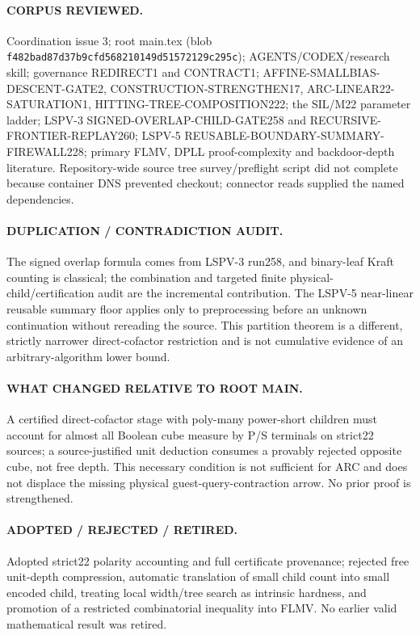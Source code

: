 \documentclass[10pt]{article}
\begin{document}
\paragraph{CORPUS REVIEWED.} Coordination issue 3; root main.tex (blob \texttt{f482bad87d37b9cfd568210149d51572129c295c}); AGENTS/CODEX/research skill; governance REDIRECT1 and CONTRACT1; AFFINE-SMALLBIAS-DESCENT-GATE2, CONSTRUCTION-STRENGTHEN17, ARC-LINEAR22-SATURATION1, HITTING-TREE-COMPOSITION222; the SIL/M22 parameter ladder; LSPV-3 SIGNED-OVERLAP-CHILD-GATE258 and RECURSIVE-FRONTIER-REPLAY260; LSPV-5 REUSABLE-BOUNDARY-SUMMARY-FIREWALL228; primary FLMV, DPLL proof-complexity and backdoor-depth literature. Repository-wide source tree survey/preflight script did not complete because container DNS prevented checkout; connector reads supplied the named dependencies.

\paragraph{DUPLICATION / CONTRADICTION AUDIT.} The signed overlap formula comes from LSPV-3 run258, and binary-leaf Kraft counting is classical; the combination and targeted finite physical-child/certification audit are the incremental contribution. The LSPV-5 near-linear reusable summary floor applies only to preprocessing before an unknown continuation without rereading the source. This partition theorem is a different, strictly narrower direct-cofactor restriction and is not cumulative evidence of an arbitrary-algorithm lower bound.

\paragraph{WHAT CHANGED RELATIVE TO ROOT MAIN.} A certified direct-cofactor stage with poly-many power-short children must account for almost all Boolean cube measure by P/S terminals on strict22 sources; a source-justified unit deduction consumes a provably rejected opposite cube, not free depth. This necessary condition is not sufficient for ARC and does not displace the missing physical guest-query-contraction arrow. No prior proof is strengthened.

\paragraph{ADOPTED / REJECTED / RETIRED.} Adopted strict22 polarity accounting and full certificate provenance; rejected free unit-depth compression, automatic translation of small child count into small encoded child, treating local width/tree search as intrinsic hardness, and promotion of a restricted combinatorial inequality into FLMV. No earlier valid mathematical result was retired.
\end{document}
